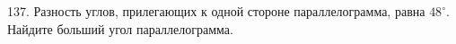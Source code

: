 137. Разность углов, прилегающих к одной стороне параллелограмма, равна $48^\circ.$ Найдите больший угол параллелограмма.\\
